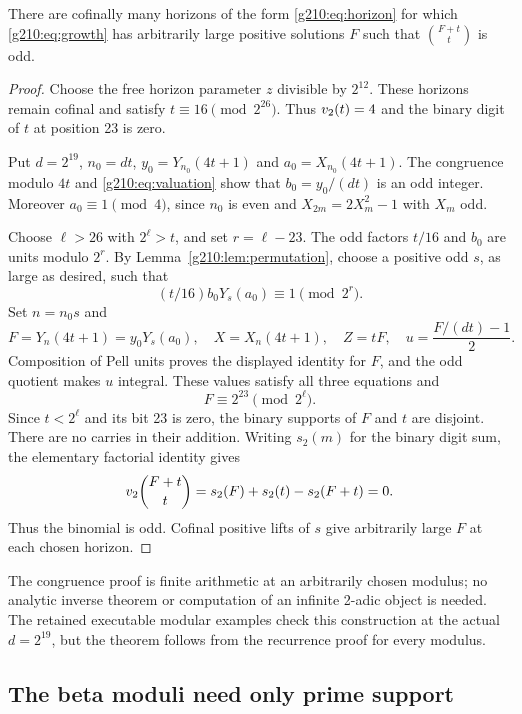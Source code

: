 \begin{theorem}\label{g210:thm:cofinal}
There are cofinally many horizons of the form \eqref{g210:eq:horizon} for which
\eqref{g210:eq:growth} has arbitrarily large positive solutions $F$ such that
$\binom{F+t}{t}$ is odd.
\end{theorem}
\begin{proof}
Choose the free horizon parameter $z$ divisible by $2^{12}$. These horizons
remain cofinal and satisfy $t\equiv16\pmod{2^{26}}$. Thus $v_2(t)=4$ and
the binary digit of $t$ at position 23 is zero.

Put $d=2^{19}$, $n_0=dt$, $y_0=Y_{n_0}(4t+1)$ and
$a_0=X_{n_0}(4t+1)$. The congruence modulo $4t$ and
\eqref{g210:eq:valuation} show that $b_0=y_0/(dt)$ is an odd integer.
Moreover $a_0\equiv1\pmod4$, since $n_0$ is even and
$X_{2m}=2X_m^2-1$ with $X_m$ odd.

Choose $\ell>26$ with $2^\ell>t$, and set $r=\ell-23$. The odd factors
$t/16$ and $b_0$ are units modulo $2^r$. By Lemma~\ref{g210:lem:permutation},
choose a positive odd $s$, as large as desired, such that
\[
(t/16)b_0Y_s(a_0)\equiv1\pmod{2^r}.
\]
Set $n=n_0s$ and
\[
F=Y_n(4t+1)=y_0Y_s(a_0),\quad X=X_n(4t+1),\quad Z=tF,
\quad u=\frac{F/(dt)-1}{2}.
\]
Composition of Pell units proves the displayed identity for $F$, and the odd
quotient makes $u$ integral. These values satisfy all three equations and
\begin{equation}\label{g210:eq:binarytarget}
F\equiv2^{23}\pmod{2^\ell}.
\end{equation}
Since $t<2^\ell$ and its bit 23 is zero, the binary supports of $F$ and $t$
are disjoint. There are no carries in their addition. Writing $s_2(m)$ for
the binary digit sum, the elementary factorial identity gives
\[
v_2\binom{F+t}{t}=s_2(F)+s_2(t)-s_2(F+t)=0.
\]
Thus the binomial is odd. Cofinal positive lifts of $s$ give arbitrarily
large $F$ at each chosen horizon.
\end{proof}

The congruence proof is finite arithmetic at an arbitrarily chosen modulus;
no analytic inverse theorem or computation of an infinite 2-adic object is
needed. The retained executable modular examples check this construction
at the actual $d=2^{19}$, but the theorem follows from the recurrence proof
for every modulus.

\subsection{The beta moduli need only prime support}

